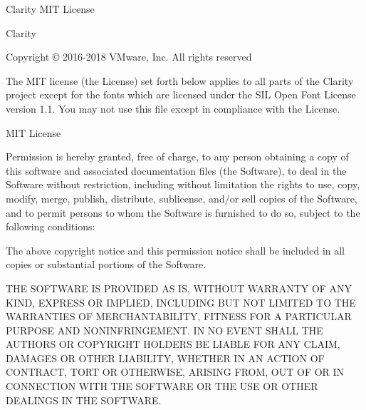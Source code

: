 
\begin{frame}{Clarity MIT License}
\begin{tiny}
Clarity

Copyright © 2016-2018 VMware, Inc.  All rights reserved

The MIT license (the License) set forth below applies to all parts of the Clarity project except for the fonts which are licensed under the SIL Open Font License version 1.1.  You may not use this file except in compliance with the License.

MIT License

Permission is hereby granted, free of charge, to any person obtaining a copy of this software and associated documentation files (the Software), to deal in the Software without restriction, including without limitation the rights to use, copy, modify, merge, publish, distribute, sublicense, and/or sell copies of the Software, and to permit persons to whom the Software is furnished to do
so, subject to the following conditions:

The above copyright notice and this permission notice shall be included in all copies or substantial portions of the Software.

THE SOFTWARE IS PROVIDED AS IS, WITHOUT WARRANTY OF ANY KIND, EXPRESS OR IMPLIED, INCLUDING BUT NOT LIMITED TO THE WARRANTIES OF MERCHANTABILITY, FITNESS FOR A PARTICULAR PURPOSE AND NONINFRINGEMENT. IN NO EVENT SHALL THE AUTHORS OR COPYRIGHT HOLDERS BE LIABLE FOR ANY CLAIM, DAMAGES OR OTHER LIABILITY, WHETHER IN AN ACTION OF CONTRACT, TORT OR OTHERWISE, ARISING FROM, OUT OF OR IN CONNECTION WITH THE SOFTWARE OR THE USE OR OTHER DEALINGS IN THE SOFTWARE.
\end{tiny}
\end{frame}


